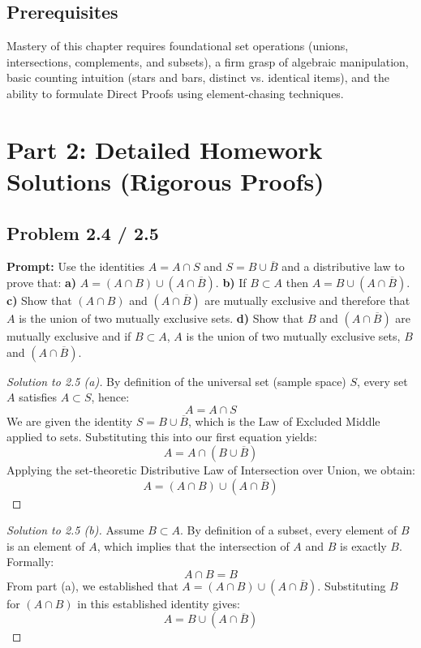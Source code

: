 \documentclass[11pt, letterpaper]{article}
\theoremstyle{definition}
\theoremstyle{remark}
\newcommand{\comp}[1]{\overline{#1}}
\begin{document}
\subsection{Prerequisites}
Mastery of this chapter requires foundational set operations (unions, intersections, complements, and subsets), a firm grasp of algebraic manipulation, basic counting intuition (stars and bars, distinct vs. identical items), and the ability to formulate Direct Proofs using element-chasing techniques.

\newpage
\section{Part 2: Detailed Homework Solutions (Rigorous Proofs)}

\subsection*{Problem 2.4 / 2.5}
\textbf{Prompt:} Use the identities $A = A \cap S$ and $S = B \cup \comp{B}$ and a distributive law to prove that:
\textbf{a)} $A = (A \cap B) \cup (A \cap \comp{B})$.
\textbf{b)} If $B \subset A$ then $A = B \cup (A \cap \comp{B})$.
\textbf{c)} Show that $(A \cap B)$ and $(A \cap \comp{B})$ are mutually exclusive and therefore that $A$ is the union of two mutually exclusive sets.
\textbf{d)} Show that $B$ and $(A \cap \comp{B})$ are mutually exclusive and if $B \subset A$, $A$ is the union of two mutually exclusive sets, $B$ and $(A \cap \comp{B})$.

\begin{proof}[Solution to 2.5 (a)]
By definition of the universal set (sample space) $S$, every set $A$ satisfies $A \subset S$, hence:
\[ A = A \cap S \]
We are given the identity $S = B \cup \comp{B}$, which is the Law of Excluded Middle applied to sets. Substituting this into our first equation yields:
\[ A = A \cap (B \cup \comp{B}) \]
Applying the set-theoretic Distributive Law of Intersection over Union, we obtain:
\[ A = (A \cap B) \cup (A \cap \comp{B}) \]
\end{proof}

\begin{proof}[Solution to 2.5 (b)]
Assume $B \subset A$. By definition of a subset, every element of $B$ is an element of $A$, which implies that the intersection of $A$ and $B$ is exactly $B$. Formally:
\[ A \cap B = B \]
From part (a), we established that $A = (A \cap B) \cup (A \cap \comp{B})$. Substituting $B$ for $(A \cap B)$ in this established identity gives:
\[ A = B \cup (A \cap \comp{B}) \]
\end{proof}
\end{document}
